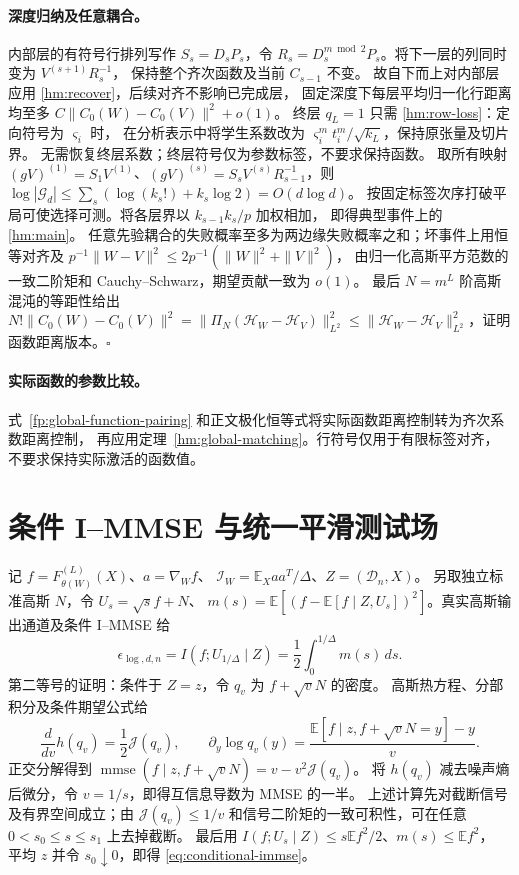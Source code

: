 \documentclass[a4paper]{tufte-handout}
\newcommand{\E}{\mathbb E}
\begin{document}
\begin{fullwidth}
\paragraph{深度归纳及任意耦合。}
内部层的有符号行排列写作 $S_s=D_sP_s$，令
$R_s=D_s^{m\bmod2}P_s$。将下一层的列同时变为 $V^{(s+1)}R_s^{-1}$，
保持整个齐次函数及当前 $C_{s-1}$ 不变。
故自下而上对内部层应用 \eqref{hm:recover}，后续对齐不影响已完成层，
固定深度下每层平均归一化行距离均至多 $C\|C_0(W)-C_0(V)\|^2+o(1)$。
终层 $q_L=1$ 只需 \eqref{hm:row-loss}：定向符号为 $\varsigma_i$ 时，
在分析表示中将学生系数改为 $\varsigma_i^m t_i^m/\sqrt{k_L}$，保持原张量及切片界。
无需恢复终层系数；终层符号仅为参数标签，不要求保持函数。
取所有映射
$(gV)^{(1)}=S_1V^{(1)}$、$(gV)^{(s)}=S_sV^{(s)}R_{s-1}^{-1}$，则
$\log|\mathcal G_d|\le\sum_s(\log(k_s!)+k_s\log2)=O(d\log d)$。
按固定标签次序打破平局可使选择可测。将各层界以 $k_{s-1}k_s/p$ 加权相加，
即得典型事件上的 \eqref{hm:main}。
任意先验耦合的失败概率至多为两边缘失败概率之和；坏事件上用恒等对齐及
$p^{-1}\|W-V\|^2\le2p^{-1}(\|W\|^2+\|V\|^2)$，
由归一化高斯平方范数的一致二阶矩和 Cauchy--Schwarz，期望贡献一致为 $o(1)$。
最后 $N=m^L$ 阶高斯混沌的等距性给出
$N!\|C_0(W)-C_0(V)\|^2=\|\Pi_N(\mathcal H_W-\mathcal H_V)\|_{L^2}^2
\le\|\mathcal H_W-\mathcal H_V\|_{L^2}^2$，证明函数距离版本。\hfill$\square$

\paragraph{实际函数的参数比较。}
式~\eqref{fp:global-function-pairing} 和正文极化恒等式将实际函数距离控制转为齐次系数距离控制，
再应用定理~\ref{hm:global-matching}。行符号仅用于有限标签对齐，不要求保持实际激活的函数值。

\section{条件 I--MMSE 与统一平滑测试场}\label{app:information}
记 $f=F_{\theta(W)}^{(L)}(X)$、$a=\nabla_Wf$、
$\mathcal I_W=\E_Xaa^T/\Delta$、$Z=(\mathcal D_n,X)$。
另取独立标准高斯 $N$，令 $U_s=\sqrt sf+N$、
$m(s)=\E[(f-\E[f\mid Z,U_s])^2]$。真实高斯输出通道及条件 I--MMSE 给
\begin{equation}\label{eq:conditional-immse}
 \epsilon_{\log,d,n}=I(f;U_{1/\Delta}\mid Z)
 =\frac12\int_0^{1/\Delta}m(s)\,ds.
\end{equation}
第二等号的证明：条件于 $Z=z$，令 $q_v$ 为 $f+\sqrt vN$ 的密度。
高斯热方程、分部积分及条件期望公式给
\[
 \frac d{dv}h(q_v)=\frac12\mathcal J(q_v),\qquad
 \partial_y\log q_v(y)=\frac{\E[f\mid z,f+\sqrt vN=y]-y}{v}.
\]
正交分解得到 $\operatorname{mmse}(f\mid z,f+\sqrt vN)=v-v^2\mathcal J(q_v)$。
将 $h(q_v)$ 减去噪声熵后微分，令 $v=1/s$，即得互信息导数为 MMSE 的一半。
上述计算先对截断信号及有界空间成立；由 $\mathcal J(q_v)\le1/v$
和信号二阶矩的一致可积性，可在任意 $0<s_0\le s\le s_1$ 上去掉截断。
最后用 $I(f;U_s\mid Z)\le s\E f^2/2$、$m(s)\le\E f^2$，
平均 $z$ 并令 $s_0\downarrow0$，即得 \eqref{eq:conditional-immse}。


\end{fullwidth}
\end{document}
